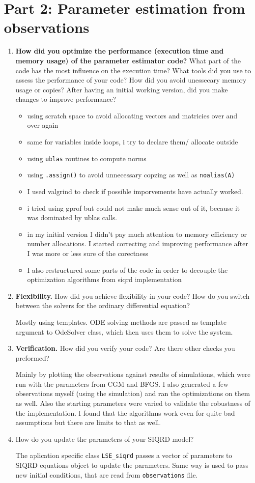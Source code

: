 \documentclass[a4paper]{article}
\newcommand{\answer}[1]{\vspace{-0.75em}\begin{framed} #1 \end{framed}\vspace{-0.75em}}
\begin{document}
\section*{Part 2: Parameter estimation from observations}
\begin{enumerate}
	\item \textbf{How did you optimize the performance (execution time and memory usage) of the parameter estimator code?} What part of the code has the most influence on the execution time? What tools did you use to assess the performance of your code? How did you avoid unessecary memory usage or copies? After having an initial working version, did you make changes to improve performance? 
	\answer{
\begin{itemize}
	\item using scratch space to avoid allocating vectors and matricies over and over again
	\item same for variables inside loops, i try to declare them/ allocate outside
	\item using \texttt{ublas} routines to compute norms 
	\item using \texttt{.assign()} to avoid unnecessary copzing as well as \texttt{noalias(A)}
	\item I used valgrind to check if possible imporvements have actually worked.
	\item i tried using gprof but could not make much sense out of it, because it was dominated by ublas calls.
	\item in my initial version I didn't pay much attention to memory efficiency or number allocations. I started correcting and improving performance after I was more or less sure of the corectness
	\item I also restructured some parts of the code in order to decouple the optimization algorithms from siqrd implementation
\end{itemize}	
}
	\item \textbf{Flexibility.} How did you achieve flexibility in your code? How do you switch between the solvers for the ordinary differential equation? 
	\answer{
	Mostly using templates. ODE solving methods are passed as template argument to OdeSolver class, which then uses them to solve the system.
}
	\item \textbf{Verification.} How did you verify your code? Are there other checks you preformed?
	\answer{
	Mainly by plotting the observations against results of simulations, which were run with the parameters from CGM and BFGS. I also generated a few observations myself (using the simulation) and ran the optimizations on them as well. Also the starting parameters were varied to validate the robustness of the implementation. I found that the algorithms work even for quite bad assumptions but there are limits to that as well.
}
	\item How do you update the parameters of your SIQRD model?
	\answer{
	The aplication specific class \texttt{LSE\_siqrd} passes a vector of parameters to SIQRD equations object to update the parameters. Same way is used to pass new initial conditions, that are read from \texttt{observations} file.
}

\end{enumerate}
\end{document}
